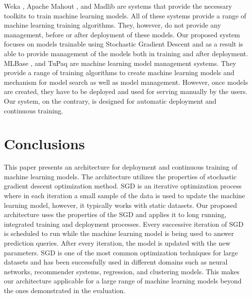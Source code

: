 \documentclass{vldb}
\begin{document}
Weka \cite{hall2009weka}, Apache Mahout \cite{Owen:2011:MA:2132656}, and Madlib \cite{hellerstein2012madlib} are systems that provide the necessary toolkits to train machine learning models. All of these systems provide a range of machine learning training algorithms. 
They, however, do not provide any management, before or after deployment of these models. 
Our proposed system focuses on models trainable using Stochastic Gradient Descent and as a result is able to provide management of the models both in training and after deployment.
MLBase \cite{kraska2013mlbase}, and TuPaq \cite{sparks2015tupaq} are machine learning model management systems.
They provide a range of training algorithms to create machine learning models and mechanism for model search as well as model management.
However, once models are created, they have to be deployed and used for serving manually by the users.
Our system, on the contrary, is designed for automatic deployment and continuous training.


\section{Conclusions} \label{conclusion}
This paper presents an architecture for deployment and continuous training of machine learning models.
The architecture utilizes the properties of stochastic gradient descent optimization method.
SGD is an iterative optimization process where in each iteration a small sample of the data is used to update the machine learning model, however, it typically works with static datasets.
Our proposed architecture uses the properties of the SGD and applies it to long running, integrated training and deployment processes.
Every successive iteration of SGD is scheduled to run while the machine learning model is being used to answer prediction queries.
After every iteration, the model is updated with the new parameters.
SGD is one of the most common optimization techniques for large datasets and has been successfully used in different domains such as neural networks, recommender systems, regression, and clustering models. This makes our architecture applicable for a large range of machine learning models beyond the ones demonstrated in the evaluation.
\end{document}
